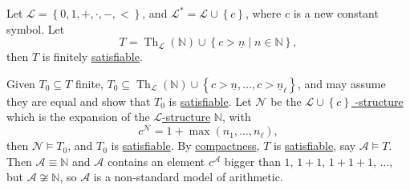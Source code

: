 \begin{eg}
	Let \(\mathcal{L} = \left\{ 0, 1, +, \cdot, -, < \right\} \), and \(\mathcal{L} ^{\ast} = \mathcal{L} \cup \left\{ c \right\} \), where \(c\) is a new constant symbol. Let
	\[
		T = \mathop{\mathrm{Th}}\nolimits_{\mathcal{L} }(\mathbb{N} ) \cup \left\{ c > \underline{n} \mid n \in \mathbb{N}  \right\} ,
	\]
	then \(T\) is finitely \hyperref[def:satisfiable]{satisfiable}.
\end{eg}
\begin{explanation}
	Given \(T_0 \subseteq T\) finite, \(T_0 \subseteq \mathop{\mathrm{Th}}\nolimits_{\mathcal{L} }(\mathbb{N} ) \cup \left\{ c> \underline{n}, \ldots , c>\underline{n}_{\ell }  \right\} \), and may assume they are equal and show that \(T_0\) is \hyperref[def:satisfiable]{satisfiable}. Let \(\mathcal{N} \) be the \hyperref[def:structure]{\(\mathcal{L} \cup \left\{ c \right\} \) -structure} which is the expansion of the \hyperref[def:structure]{\(\mathcal{L} \)-structure} \(\mathbb{N} \), with
	\[
		c^{\mathcal{N} }  = 1 + \max (n_1, \ldots , n_{\ell } ),
	\]
	then \(\mathcal{N} \models T_0\), and \(T_0\) is \hyperref[def:satisfiable]{satisfiable}. By \hyperref[thm:compactness]{compactness}, \(T\) is \hyperref[def:satisfiable]{satisfiable}, say \(\mathcal{A} \models T\). Then \(\mathcal{A} \equiv \mathbb{N} \) and \(\mathcal{A} \) contains an element \(c^{\mathcal{A} } \) bigger than \(1\), \(1+1\), \(1+1+1\), ..., but \(\mathcal{A} \not \cong \mathbb{N} \), so \(\mathcal{A} \) is a non-standard model of arithmetic.
\end{explanation}